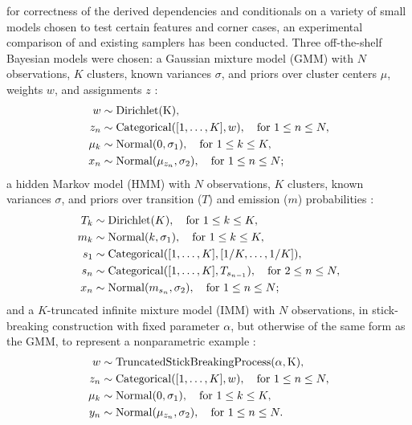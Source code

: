  for correctness of the derived dependencies and conditionals
on a variety of small models chosen to test certain features and corner cases, an experimental
comparison of \autogibbsjl{} and existing \turingjl{} samplers has been conducted.  Three
off-the-shelf Bayesian models were chosen: a Gaussian mixture model (GMM) with \(N\) observations,
\(K\) clusters, known variances \(\sigma\), and priors over cluster centers \(\mu\), weights \(w\), and
assignments \(z\) \parencite[section 6.2]{marin2007bayesian}:
\begin{equation}
  \label{eq:gmm}
  \begin{aligned}
    w &\sim \mathrm{Dirichlet(K)}, \\
    z_{n} &\sim \mathrm{Categorical}([1, \ldots, K], w), \quad\text{for } 1 \le n \le N, \\
    \mu_{k} &\sim \mathrm{Normal}(0, \sigma_{1}), \quad\text{for } 1 \le k \le K, \\
    x_{n} &\sim \mathrm{Normal}(\mu_{z_{n}}, \sigma_{2}), \quad\text{for } 1 \le n \le N;
  \end{aligned}
\end{equation}
a hidden Markov model (HMM) with \(N\) observations, \(K\) clusters, known variances \(\sigma\), and
priors over transition (\(T\)) and emission (\(m\)) probabilities \parencite[section
7.3]{marin2007bayesian}:
\begin{equation}
  \label{eq:hmm}
  \begin{aligned}
    T_{k} &\sim \mathrm{Dirichlet}(K), \quad\text{for } 1 \le k \le K, \\
    m_{k} &\sim \mathrm{Normal}(k, \sigma_{1}), \quad\text{for } 1 \le k \le K, \\
    s_{1} &\sim \mathrm{Categorical}([1, \ldots, K], [1/K, \ldots, 1/K]), \\
    s_{n} &\sim \mathrm{Categorical}([1, \ldots, K], T_{s_{n-1}}), \quad\text{for } 2 \le n \le N, \\
    x_{n} &\sim \mathrm{Normal}(m_{s_{n}}, \sigma_{2}), \quad\text{for } 1 \le n \le N;
  \end{aligned}
\end{equation}
and a \(K\)-truncated infinite mixture model (IMM) with \(N\) observations, in stick-breaking
construction with fixed parameter \(\alpha\), but otherwise of the same form as the GMM, to
represent a nonparametric example \parencite[section 2.2]{hjort2010bayesian}:
\begin{equation}
  \label{eq:imm}
  \begin{aligned}
    w &\sim \mathrm{TruncatedStickBreakingProcess(\alpha, K)}, \\
    z_{n} &\sim \mathrm{Categorical}([1, \ldots, K], w), \quad\text{for } 1 \le n \le N, \\
    \mu_{k} &\sim \mathrm{Normal}(0, \sigma_{1}), \quad\text{for } 1 \le k \le K, \\
    y_{n} &\sim \mathrm{Normal}(\mu_{z_{n}}, \sigma_{2}), \quad\text{for } 1 \le n \le N.
  \end{aligned}
\end{equation}
